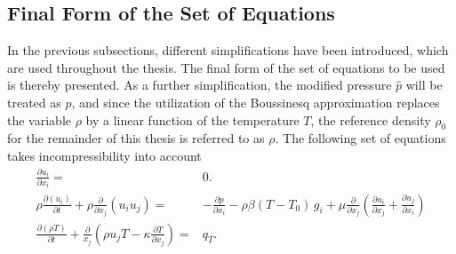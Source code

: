 \subsection{Final Form of the Set of Equations}

In the previous subsections, different simplifications have been introduced, which are used throughout the thesis. The final form of the set of equations to be used is thereby presented. As a further simplification, the modified pressure \(\hat{p}\) will be treated as \(p\), and since the utilization of the Boussinesq approximation replaces the variable \(\rho\) by a linear function of the temperature \(T\), the reference density \(\rho_0\) for the remainder of this thesis is referred to as \(\rho\). The following set of equations takes incompressibility into account
\begin{subequations}
\label{eq:completeset}
\begin{align}
\label{eq:contidiff}
\frac{\partial u_i}{\partial x_i} =& 0. \\[1em]
\label{eq:momentumdiff}
\rho \frac{\partial \left( u_i \right)}{\partial t} 
+ \rho \frac{\partial}{\partial x_j} \left( u_i  u_j \right) 
=& - \frac{\partial p}{\partial x_i} 
- \rho \beta \left( T - T_0 \right)\, g_i
+  \mu \frac{\partial}{\partial x_j} \left( \frac{\partial u_i}{\partial x_j} 
+ \frac{\partial u_j}{\partial x_i} \right) \\[1em]
\label{eq:temperaturediff}
\frac{\partial \left(\rho T \right)}{\partial t} + \frac{\partial}{x_j} \left( \rho u_j T - \kappa \frac{\partial T}{\partial x_j} \right) =& q_T.
\end{align}
\end{subequations}

